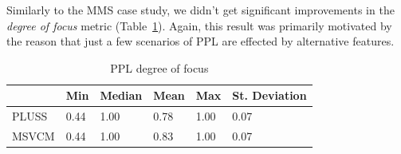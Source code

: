 




Similarly to the MMS case study, we
didn't get significant improvements in the \emph{degree of focus} metric
(Table~\ref{tab:ppl-dof}). Again, this result was primarily motivated by the
reason that just a few scenarios of PPL are effected by alternative features. 

\begin{table}[htb] \centering
\caption{PPL degree of focus}
\label{tab:ppl-dof}
\begin{small}
\begin{tabular}{llllll} \hline
					& Min 	& Median 	& Mean 	& Max 	& St. Deviation \\ \hline
	PLUSS			& 0.44	& 1.00		& 0.78	& 1.00	& 0.07			\\
	MSVCM			& 0.44  & 1.00  	& 0.83 	& 1.00 	& 0.07			\\ \hline	
\end{tabular}
\end{small}
\end{table}

